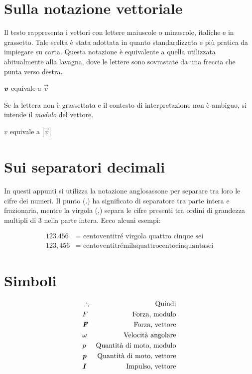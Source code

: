 
\section{Sulla notazione vettoriale}
Il testo rappresenta i vettori con lettere maiuscole o minuscole,
italiche e in grassetto. Tale scelta è stata adottata in quanto
standardizzata e più pratica da impiegare su carta. Questa notazione
è equivalente a quella utilizzata abitualmente alla lavagna, dove
le lettere sono sovrastate da una freccia che punta verso destra.

\begin{center}
    $\textbf{\textit{v}}$ equivale a $\vec{v}$
\end{center}

\noindent Se la lettera non è grassettata e il contesto di interpretazione
non è ambiguo, si intende il \textit{modulo} del vettore.

\begin{center}
    $v$ equivale a $|\vec{v}|$
\end{center}


\section{Sui separatori decimali}
In questi appunti si utilizza la notazione anglosassone per separare tra
loro le cifre dei numeri. Il punto (.) ha significato di separatore tra
parte intera e frazionaria, mentre la virgola (,) separa le cifre presenti
tra ordini di grandezza multipli di 3 nella parte intera. Ecco alcuni
esempi:

\begin{align*}
    123.456 &= \text{ centoventitré virgola quattro cinque sei}\\
    123,456 &= \text{ centoventitrémilaquattrocentocinquantasei}
\end{align*}


\section{Simboli}

\begin{align*}
    &\therefore  & \text{Quindi}\\
    &F           & \text{Forza, modulo}\\
    &\textbf{\textit{F}} & \text{Forza, vettore}\\
    &\omega      & \text{Velocità angolare}\\
    &p           & \text{Quantità di moto, modulo}\\
    &\textbf{\textit{p}} & \text{Quantità di moto, vettore}\\
    &\textbf{\textit{I}} & \text{Impulso, vettore}
\end{align*}

